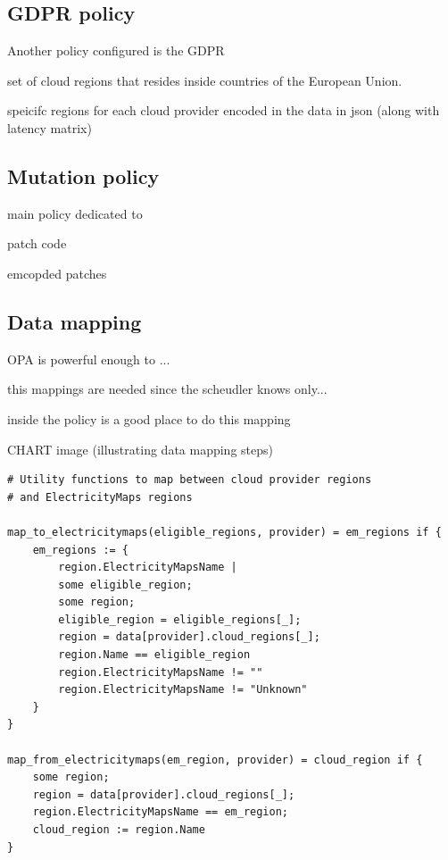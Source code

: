 \subsection{GDPR policy}


Another policy configured is the GDPR


set of cloud regions that resides inside countries of the European Union.

speicifc regions for each cloud provider
encoded in the data in json (along with latency matrix)

\subsection{Mutation policy}

main policy
dedicated to 


patch code

emcopded patches


\subsection{Data mapping}

OPA is powerful enough to ...


this mappings are needed since the scheudler knows only...

inside the policy is a good place to do this mapping


CHART image (illustrating data mapping steps) \\


\begin{lstlisting}[language=Rego, caption=Rego data mapping, label=lst:rego_data_mapping]
# Utility functions to map between cloud provider regions 
# and ElectricityMaps regions

map_to_electricitymaps(eligible_regions, provider) = em_regions if {
    em_regions := {
        region.ElectricityMapsName |                             
        some eligible_region;                       
        some region;                                
        eligible_region = eligible_regions[_];      
        region = data[provider].cloud_regions[_];   
        region.Name == eligible_region             
        region.ElectricityMapsName != ""            
        region.ElectricityMapsName != "Unknown"
    }
}

map_from_electricitymaps(em_region, provider) = cloud_region if {
    some region;                              
    region = data[provider].cloud_regions[_];   
    region.ElectricityMapsName == em_region;    
    cloud_region := region.Name 
}

\end{lstlisting}







